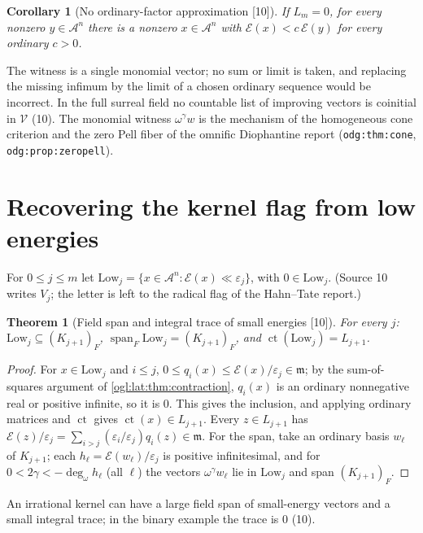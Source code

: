 \documentclass[11pt,oneside]{article}
\numberwithin{equation}{section}
\newtheorem{theorem}{Theorem}[section]
\newtheorem{corollary}[corollary]{Corollary}
\theoremstyle{definition}
\theoremstyle{remark}
\newcommand{\A}{\mathcal A}
\newcommand{\cE}{\mathcal E}
\newcommand{\mm}{\mathfrak m}
\newcommand{\ct}{\operatorname{ct}}
\newcommand{\ddeg}{\operatorname{deg}_{\omega}}
\newcommand{\Span}{\operatorname{span}}
\newcommand{\src}[1]{\textup{\textsf{\small[#1]}}}
\newcommand{\replabel}[1]{\nolinkurl{#1}}
\begin{document}
\begin{corollary}[No ordinary-factor approximation \src{10}]\label{ogl:lat:cor:noapprox}
If $L_m=0$, for every nonzero $y\in\A^n$ there is a nonzero $x\in\A^n$ with
$\cE(x)<c\,\cE(y)$ for every ordinary $c>0$.
\end{corollary}

The witness is a single monomial vector; no sum or limit is taken, and replacing
the missing infimum by the limit of a chosen ordinary sequence would be
incorrect. In the full surreal field no countable list of improving vectors is
coinitial in $\mathscr V$ (10). The monomial witness $\omega^\gamma w$ is the
mechanism of the homogeneous cone criterion and the zero Pell fiber of the
omnific Diophantine report (\replabel{odg:thm:cone},
\replabel{odg:prop:zeropell}).

\section{Recovering the kernel flag from low energies}\label{ogl:lat:sec:lowflag}

For $0\le j\le m$ let $\mathrm{Low}_j=\{x\in\A^n:\cE(x)\ll\varepsilon_j\}$, with
$0\in\mathrm{Low}_j$. (Source 10 writes $V_j$; the letter is left to the radical
flag of the Hahn--Tate report.)

\begin{theorem}[Field span and integral trace of small energies \src{10}]\label{ogl:lat:thm:lowflag}
For every $j$: $\mathrm{Low}_j\subseteq(K_{j+1})_F$,
$\Span_F\mathrm{Low}_j=(K_{j+1})_F$, and $\ct(\mathrm{Low}_j)=L_{j+1}$.
\end{theorem}
\begin{proof}
For $x\in\mathrm{Low}_j$ and $i\le j$,
$0\le q_i(x)\le\cE(x)/\varepsilon_j\in\mm$; by the sum-of-squares argument of
\cref{ogl:lat:thm:contraction}, $q_i(x)$ is an ordinary nonnegative real or
positive infinite, so it is $0$. This gives the inclusion, and applying ordinary
matrices and $\ct$ gives $\ct(x)\in L_{j+1}$. Every $z\in L_{j+1}$ has
$\cE(z)/\varepsilon_j=\sum_{i>j}(\varepsilon_i/\varepsilon_j)q_i(z)\in\mm$. For
the span, take an ordinary basis $w_\ell$ of $K_{j+1}$; each
$h_\ell=\cE(w_\ell)/\varepsilon_j$ is positive infinitesimal, and for
$0<2\gamma<-\ddeg h_\ell$ (all $\ell$) the vectors $\omega^\gamma w_\ell$ lie in
$\mathrm{Low}_j$ and span $(K_{j+1})_F$.
\end{proof}

An irrational kernel can have a large field span of small-energy vectors and a
small integral trace; in the binary example the trace is $0$ (10).
\end{document}
